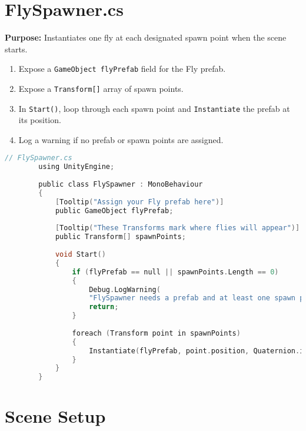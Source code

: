 \documentclass[11pt]{article}
\begin{document}
	\section{FlySpawner.cs}
	
	\textbf{Purpose:} Instantiates one fly at each designated spawn point when the scene starts.
	
	\begin{enumerate}[label=\arabic*.]
		\item Expose a \texttt{GameObject flyPrefab} field for the Fly prefab.  
		\item Expose a \texttt{Transform[]} array of spawn points.  
		\item In \texttt{Start()}, loop through each spawn point and \texttt{Instantiate} the prefab at its position.  
		\item Log a warning if no prefab or spawn points are assigned.  
	\end{enumerate}
	
	\begin{lstlisting}[language=C]
		// FlySpawner.cs
		using UnityEngine;
		
		public class FlySpawner : MonoBehaviour
		{
			[Tooltip("Assign your Fly prefab here")]
			public GameObject flyPrefab;
			
			[Tooltip("These Transforms mark where flies will appear")]
			public Transform[] spawnPoints;
			
			void Start()
			{
				if (flyPrefab == null || spawnPoints.Length == 0)
				{
					Debug.LogWarning(
					"FlySpawner needs a prefab and at least one spawn point.");
					return;
				}
				
				foreach (Transform point in spawnPoints)
				{
					Instantiate(flyPrefab, point.position, Quaternion.identity);
				}
			}
		}
	\end{lstlisting}
	
	\section{Scene Setup}
	
\end{document}
